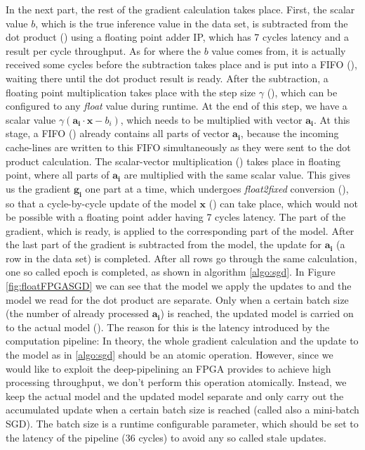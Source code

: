 \documentclass{article}
\newcommand*\circled[1]{\tikz[baseline=(char.base)]{
\node[shape=circle,draw,color=black,text=black,inner sep=0.05pt](char){#1};}}
\begin{document}
In the next part, the rest of the gradient calculation takes place. First, the scalar value $b$, which is the true inference value in the data set, is subtracted from the dot product (\circled{6}) using a floating point adder IP, which has 7 cycles latency and a result per cycle throughput. As for where the $b$ value comes from, it is actually received some cycles before the subtraction takes place and is put into a FIFO (\circled{B}), waiting there until the dot product result is ready. After the subtraction, a floating point multiplication takes place with the step size $\gamma$ (\circled{7}), which can be configured to any \textit{float} value during runtime. At the end of this step, we have a scalar value $\gamma(\mathbf{a_i}\cdot\mathbf{x}-b_i)$, which needs to be multiplied with vector $\mathbf{a_i}$. At this stage, a FIFO (\circled{A}) already contains all parts of vector $\mathbf{a_i}$, because the incoming cache-lines are written to this FIFO simultaneously as they were sent to the dot product calculation. The scalar-vector multiplication (\circled{8}) takes place in floating point, where all parts of $\mathbf{a_i}$ are multiplied with the same scalar value. This gives us the gradient $\mathbf{g_i}$ one part at a time, which undergoes \textit{float2fixed} conversion (\circled{9}), so that a cycle-by-cycle update of the model $\mathbf{x}$ (\circled{C}) can take place, which would not be possible with a floating point adder having 7 cycles latency. The part of the gradient, which is ready, is applied to the corresponding part of the model. After the last part of the gradient is subtracted from the model, the update for $\mathbf{a_i}$ (a row in the data set) is completed. After all rows go through the same calculation, one so called epoch is completed, as shown in algorithm \eqref{algo:sgd}. In Figure \ref{fig:floatFPGASGD} we can see that the model we apply the updates to and the model we read for the dot product are separate. Only when a certain batch size (the number of already processed $\mathbf{a_i}$) is reached, the updated model is carried on to the actual model (\circled{D}). The reason for this is the latency introduced by the computation pipeline: In theory, the whole gradient calculation and the update to the model as in \eqref{algo:sgd} should be an atomic operation. However, since we would like to exploit the deep-pipelining an FPGA provides to achieve high processing throughput, we don't perform this operation atomically. Instead, we keep the actual model and the updated model separate and only carry out the accumulated update when a certain batch size is reached (called also a mini-batch SGD). The batch size is a runtime configurable parameter, which should be set to the latency of the pipeline (36 cycles) to avoid any so called stale updates.
\end{document}
